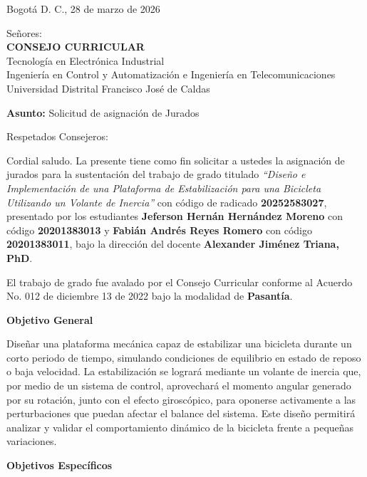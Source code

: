 \documentclass[10pt,letterpaper]{article} %
\begin{document}
\singlespacing
\RaggedRight 

Bogotá D. C., 28 de marzo de 2026

\vspace{0.2cm}

Señores:\\
\textbf{CONSEJO CURRICULAR}\\
Tecnología en Electrónica Industrial\\
Ingeniería en Control y Automatización e Ingeniería en Telecomunicaciones\\
Universidad Distrital Francisco José de Caldas

\vspace{0.3cm}

\textbf{Asunto:} Solicitud de asignación de Jurados 

\vspace{0.3cm}

Respetados Consejeros:

Cordial saludo. La presente tiene como fin solicitar a ustedes la asignación de jurados para la sustentación del trabajo de grado titulado \textit{“Diseño e Implementación de una Plataforma de Estabilización para una Bicicleta Utilizando un Volante de Inercia”} con código de radicado \textbf{20252583027}, presentado por los estudiantes \textbf{Jeferson Hernán Hernández Moreno} con código \textbf{20201383013} y \textbf{Fabián Andrés Reyes Romero} con código \textbf{20201383011}, bajo la dirección del docente \textbf{Alexander Jiménez Triana, PhD}.

El trabajo de grado fue avalado por el Consejo Curricular conforme al Acuerdo No. 012 de diciembre 13 de 2022 bajo la modalidad de \textbf{Pasantía}.

\textbf{Objetivo General}

Diseñar una plataforma mecánica capaz de estabilizar una bicicleta durante un corto periodo de tiempo, simulando condiciones de equilibrio en estado de reposo o baja velocidad. La estabilización se logrará mediante un volante de inercia que, por medio de un sistema de control, aprovechará el momento angular generado por su rotación, junto con el efecto giroscópico, para oponerse activamente a las perturbaciones que puedan afectar el balance del sistema. Este diseño permitirá analizar y validar el comportamiento dinámico de la bicicleta frente a pequeñas variaciones.

\textbf{Objetivos Específicos}
\end{document}
